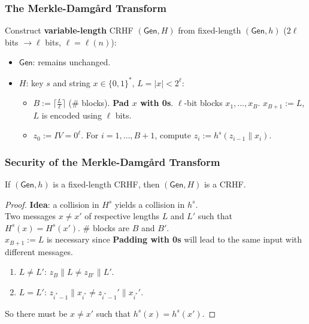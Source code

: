 \begin{frame}\frametitle{The Merkle-Damg\r{a}rd Transform}
\begin{figure}
\begin{center}

\end{center}
\end{figure}
\begin{construction}
Construct \textbf{variable-length} CRHF $(\mathsf{Gen}, H)$ from fixed-length $(\mathsf{Gen}, h)$ ($2\ell$ bits $\to \ell$ bits, $\ell = \ell(n)$):
\begin{itemize}
\item $\mathsf{Gen}$: remains unchanged.
\item $H$: key $s$ and string $x \in \{0,1\}^*$, $L=|x|< 2^{\ell}$:
\begin{itemize}
\item $B := \lceil \frac{L}{\ell} \rceil$ (\# blocks). \textbf{Pad $x$ with 0s}.  $\ell$-bit blocks $x_1,\dotsc,x_B$. $x_{B+1} := L$, $L$ is encoded using $\ell$ bits.
\item $z_0 := IV = 0^\ell$. For $i=1,\dotsc,B+1$, compute $z_i := h^s(z_{i-1}\| x_i)$.
\end{itemize}
\end{itemize}
\end{construction}
\end{frame}
\begin{frame}\frametitle{Security of the Merkle-Damg\r{a}rd Transform}
\begin{theorem}
If $(\mathsf{Gen},h)$ is a fixed-length CRHF, then $(\mathsf{Gen},H)$ is a CRHF.
\end{theorem}
\begin{proof}
\textbf{Idea}: a collision in $H^s$ yields a collision in $h^s$. \\
Two messages $x \ne x'$ of respective lengths $L$ and $L'$ such that $H^s(x) = H^s(x')$. \# blocks are $B$ and $B'$. \\
$x_{B+1} := L$ is necessary since \textbf{Padding with 0s} will lead to the same input with different messages.
\begin{enumerate}
\item $L \ne L'$: $z_B\| L \ne z_{B'}\| L'$.
\item $L = L'$: $z_{i^*-1}\| x_{i^*} \ne z_{i^*-1}'\| x_{i^*}'$.
\end{enumerate}
So there must be $x \neq x'$ such that $h^s(x) = h^s(x')$.
\end{proof}
\end{frame}
